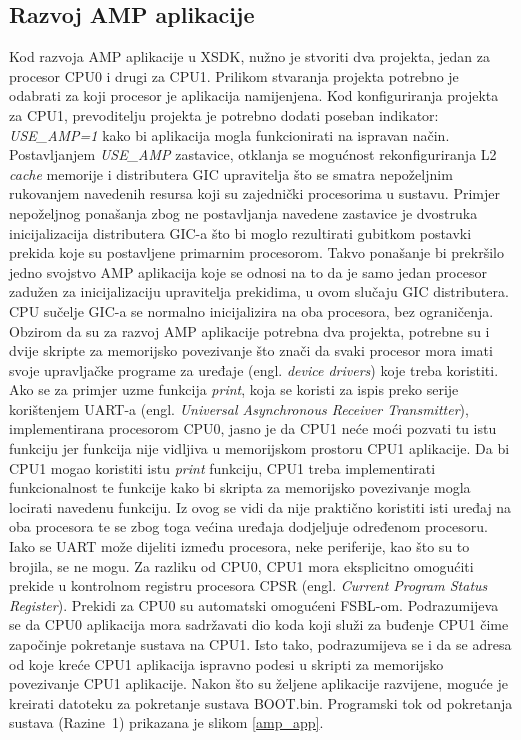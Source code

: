 \documentclass[times, utf8, diplomski, numeric]{fer}
\begin{document}
\subsection{Razvoj AMP aplikacije}
Kod razvoja AMP aplikacije u XSDK, nužno je stvoriti dva projekta, jedan za procesor CPU0 i drugi za CPU1.
Prilikom stvaranja projekta potrebno je odabrati za koji procesor je aplikacija namijenjena. Kod konfiguriranja
projekta za CPU1, prevoditelju projekta je potrebno dodati poseban indikator: \textit{USE\_AMP=1} kako bi aplikacija mogla
funkcionirati na ispravan način. Postavljanjem \textit{USE\_AMP} zastavice, otklanja se mogućnost rekonfiguriranja L2 \textit{cache}
memorije i distributera GIC upravitelja što se smatra nepoželjnim rukovanjem navedenih resursa koji su zajednički procesorima
u sustavu. Primjer nepoželjnog ponašanja zbog ne postavljanja navedene zastavice je dvostruka inicijalizacija distributera
GIC-a što bi moglo rezultirati gubitkom postavki prekida koje su postavljene primarnim procesorom. Takvo ponašanje bi
prekršilo jedno svojstvo AMP aplikacija koje se odnosi na to da je samo jedan procesor zadužen za inicijalizaciju upravitelja
prekidima, u ovom slučaju GIC distributera. CPU sučelje GIC-a se normalno inicijalizira na oba procesora, bez ograničenja.
Obzirom da su za razvoj AMP aplikacije potrebna dva projekta, potrebne su i dvije skripte za memorijsko povezivanje što
znači da svaki procesor mora imati svoje upravljačke programe za uređaje (engl. \textit{device drivers}) koje treba koristiti.
Ako se za primjer uzme funkcija \textit{print}, koja se koristi za ispis preko serije korištenjem UART-a (engl. \textit{Universal
Asynchronous Receiver Transmitter}), implementirana procesorom CPU0, jasno je da CPU1 neće moći pozvati tu istu funkciju
jer funkcija nije vidljiva u memorijskom prostoru CPU1 aplikacije. Da bi CPU1 mogao koristiti istu \textit{print} funkciju,
CPU1 treba implementirati funkcionalnost te funkcije kako bi skripta za memorijsko povezivanje mogla locirati navedenu
funkciju. Iz ovog se vidi da nije praktično koristiti isti uređaj na oba procesora te se zbog toga većina uređaja dodjeljuje
određenom procesoru. Iako se UART može dijeliti između procesora, neke periferije, kao što su to brojila, se ne mogu.
Za razliku od CPU0, CPU1 mora eksplicitno omogućiti prekide u kontrolnom registru procesora CPSR (engl. \textit{Current
Program Status Register}). Prekidi za CPU0 su
automatski omogućeni FSBL-om. Podrazumijeva se da CPU0 aplikacija mora sadržavati dio koda koji služi za buđenje CPU1
čime započinje pokretanje sustava na CPU1. Isto tako, podrazumijeva se i da se adresa od koje kreće CPU1 aplikacija
ispravno podesi u skripti za memorijsko povezivanje CPU1 aplikacije. Nakon što su željene aplikacije razvijene, moguće
je kreirati datoteku za pokretanje sustava BOOT.bin. Programski tok od pokretanja sustava (Razine~1) prikazana je slikom
\ref{amp_app}.
\end{document}

